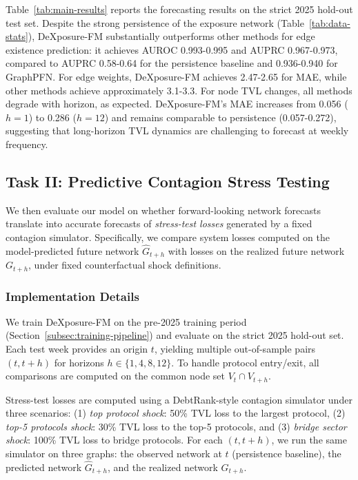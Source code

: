 Table~\ref{tab:main-results} reports the forecasting results on the strict 2025 hold-out test set. 
Despite the strong persistence of the exposure network (Table~\ref{tab:data-stats}), DeXposure-FM substantially outperforms other methods for {edge existence} prediction: it achieves AUROC 0.993-0.995 and AUPRC 0.967-0.973, compared to AUPRC 0.58-0.64 for the persistence baseline and 0.936-0.940 for GraphPFN. %
For {edge weights}, %
DeXposure-FM achieves 2.47-2.65 for MAE, %
while other methods achieve approximately 3.1-3.3. %
For {node TVL changes}, all methods degrade with horizon, as expected. DeXposure-FM's MAE increases from 0.056 ($h=1$) to 0.286 ($h=12$) and remains comparable to persistence (0.057-0.272), suggesting that long-horizon TVL dynamics are challenging to forecast at weekly frequency.

\subsection{Task II: Predictive Contagion Stress Testing}
\label{subsec:stability}

We then evaluate our model on whether forward-looking network forecasts translate into accurate forecasts of \emph{stress-test losses} generated by a fixed contagion simulator. Specifically, we compare system losses computed on the model-predicted future network $\hat{G}_{t+h}$ with losses on the realized future network $G_{t+h}$, under fixed counterfactual shock definitions.

\subsubsection{Implementation Details}
\label{subsubsec:task2-impl}

We train DeXposure-FM on the pre-2025 training period (Section~\ref{subsec:training-pipeline}) and evaluate on the strict 2025 hold-out set. Each test week provides an origin $t$, yielding multiple out-of-sample pairs $(t,t+h)$ for horizons $h\in\{1,4,8,12\}$. To handle protocol entry/exit, all comparisons are computed on the common node set $V_t \cap V_{t+h}$.

Stress-test losses are computed using a DebtRank-style contagion simulator \citep{EisenbergNoe2001,BattistonEtAl2012DebtRank} under three scenarios: (1) \emph{top protocol shock}: 50\% TVL loss to the largest protocol, (2) \emph{top-5 protocols shock}: 30\% TVL loss to the top-5 protocols, and (3) \emph{bridge sector shock}: 100\% TVL loss to bridge protocols. For each $(t,t+h)$, we run the same simulator on three graphs: the observed network at $t$ (persistence baseline), the predicted network $\hat{G}_{t+h}$, and the realized network $G_{t+h}$.


